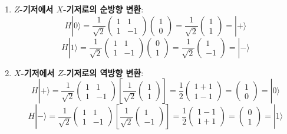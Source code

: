 \documentclass[11pt, a4paper]{article}
\newcommand{\ket}[1]{|#1\rangle}
\theoremstyle{definition}
\begin{document}
\begin{enumerate}
    \item \textbf{$Z$-기저에서 $X$-기저로의 순방향 변환}:
    $$H\ket{0} = \frac{1}{\sqrt{2}}\begin{pmatrix} 1 & 1 \\ 1 & -1 \end{pmatrix}\begin{pmatrix} 1 \\ 0 \end{pmatrix} = \frac{1}{\sqrt{2}}\begin{pmatrix} 1 \\ 1 \end{pmatrix} = \ket{+}$$
    $$H\ket{1} = \frac{1}{\sqrt{2}}\begin{pmatrix} 1 & 1 \\ 1 & -1 \end{pmatrix}\begin{pmatrix} 0 \\ 1 \end{pmatrix} = \frac{1}{\sqrt{2}}\begin{pmatrix} 1 \\ -1 \end{pmatrix} = \ket{-}$$
    \item \textbf{$X$-기저에서 $Z$-기저로의 역방향 변환}:
    $$H\ket{+} = \frac{1}{\sqrt{2}}\begin{pmatrix} 1 & 1 \\ 1 & -1 \end{pmatrix}\left[\frac{1}{\sqrt{2}}\begin{pmatrix} 1 \\ 1 \end{pmatrix}\right] = \frac{1}{2}\begin{pmatrix} 1+1 \\ 1-1 \end{pmatrix} = \begin{pmatrix} 1 \\ 0 \end{pmatrix} = \ket{0}$$
    $$H\ket{-} = \frac{1}{\sqrt{2}}\begin{pmatrix} 1 & 1 \\ 1 & -1 \end{pmatrix}\left[\frac{1}{\sqrt{2}}\begin{pmatrix} 1 \\ -1 \end{pmatrix}\right] = \frac{1}{2}\begin{pmatrix} 1-1 \\ 1+1 \end{pmatrix} = \begin{pmatrix} 0 \\ 1 \end{pmatrix} = \ket{1}$$

\end{enumerate}
\end{document}

